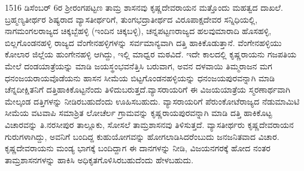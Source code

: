1516 ಡಿಸೆಂಬರ್​ 6ರ ಶ‍್ರೀರಂಗಪಟ್ಟಣ ತಾಮ್ರ ಶಾಸನವು ಕೃಷ್ಣದೇವರಾಯನ ಮತ್ತೊಂದು ಮಹತ್ವದ ದಾಖಲೆ. ಬ್ರಹ್ಮಣ್ಯತೀರ್ಥರ ಶಿಷ್ಯರಾದ ವ್ಯಾಸತೀರ್ಥರಿಗೆ, ತುಂಗಭದ್ರಾತೀರ್ಥದ ವಿರೂಪಾಕ್ಷದೇವರ ಸನ್ನಿಧಿಯಲ್ಲಿ, ನಾಗಮಂಗಲ\-ರಾಜ್ಯದ ಚಿಕ್ಕಬ್ಬೆಹಳ್ಳಿ (ಇಂದಿನ ಚಿಕ್ಕಬಳ್ಳಿ), ಚನ್ನಪಟ್ಟಣರಾಜ್ಯದ ಹಲವುಮಾರಾದಿ ಹೊಸಹಳ್ಳಿ, ಬಿಲ್ಲಗೊಂಡನಹಳ್ಳಿ ರಾಜ್ಯದ ವೆಂಗೇನಹಳ್ಳಿಗಳನ್ನು ಸರ್ವಮಾನ್ಯವಾಗಿ ದತ್ತಿ ಹಾಕಿಕೊಡುತ್ತಾನೆ. ವೆಂಗೇನಹಳ್ಳಿಯು ಕೋಲಾರ ಜಿಲ್ಲೆಯ ಹುಂಗೇನಹಳ್ಳಿ ಆಗಿದ್ದು, ಇಲ್ಲಿ ಮಾಧ್ವರ ಮಠವಿದೆ. ಇದೇ ಕಾಲದಲ್ಲಿ ಕೃಷ್ಣರಾಯನು ಗಜಪತಿಯ ಮೇಲೆ ದಂಡಯಾತ್ರೆಯನ್ನು ಮಾಡಿ ಜಯಸ್ಥಂಭವನೆತ್ತಿಸಿ ಬರುವಾಗ, ಅವನ ದಳವಾಯಿ ತಿಮ್ಮರಾಜನ ಮಗ ಧನಂಜಯರಾಯವೊಡೆಯನು ಹಾಸನ ಸೀಮೆಯ ಬಿಟ್ಟಗೊಂಡನಹಳ್ಳಿಯನ್ನು ಧನಂಜಯಪುರವನ್ನಾಗಿ ಮಾಡಿ ಚೆನ್ನದೀಕ್ಷಿತನಿಗೆ ದತ್ತಿಹಾಕಿಕೊಟ್ಟನೆಂದು ತಿಳಿದುಬರುತ್ತದೆ.\break ವ್ಯಾಸರಾಯರಿಗೆ ಈ ವಿಜಯಯಾತ್ರೆಯ ಸ್ಮರಣಾರ್ಥವಾಗಿ ಮೇಲ್ಕಂಡ ದತ್ತಿಗಳನ್ನು ನೀಡಿರಬಹುದೆಂದು ಊಹಿಸಬಹುದು. ವ್ಯಾಸರಾಯರಿಗೆ ಪೆರುಂಕೋಟೆರಾಜ್ಯದ ನೆಡುಮಾಮಿಟಿ ಸೀಮೆಯ ವಟವಾಪಿ ಸಮಾಶ್ರಿತ ಲೋಚೆರ್ಲ ಗ್ರಾಮವನ್ನು ಕೃಷ್ಣರಾಯಪುರವನ್ನಾಗಿ ಮಾಡಿ ದತ್ತಿ ಹಾಕಿಕೊಟ್ಟ ವಿಚಾರವನ್ನು ತಿ.ನರಸೀಪುರ ತಾಲ್ಲೂಕು, ಸೋಸಲೆ ತಾಮ್ರಶಾಸನವು ತಿಳಿಸುತ್ತದೆ. ವ್ಯಾಸತೀರ್ಥರು ಕೃಷ್ಣದೇವರಾಯನ ಗುರುಗಳಾಗಿದ್ದು, ಅವನಿಗೆ ಬಂದಿದ್ದ ಕುಹುಯೋಗವನ್ನು ಹೋಗಲಾಡಿ\-ಸಿದರೆಂಬುದು ಜನಜನಿತವಾದ ವಿಚಾರ. ಕೃಷ್ಣದೇವರಾಯನು ಮಂಡ್ಯ ಭಾಗಕ್ಕೆ ಬಂದಿದ್ದಾಗ ಈ ದಾನಗಳನ್ನು ನೀಡಿ, ವಿಜಯನಗರಕ್ಕೆ ಹೋದ ನಂತರ ತಾಮ್ರಶಾಸನಗಳನ್ನು ಹಾಕಿಸಿ ಅಧಿಕೃತಗೊಳಿಸಿರ\-ಬಹುದೆಂದು ಹೇಳಬಹುದು.

\newpage

